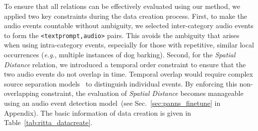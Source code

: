 To ensure that all relations can be effectively evaluated using our method, we applied two key constraints during the data creation process. First, to make the audio events countable without ambiguity, we selected inter-category audio events to form the \texttt{<textprompt,audio>} pairs. This avoids the ambiguity that arises when using intra-category events, especially for those with repetitive, similar local occurrences (\textit{e.g.}, multiple instances of dog barking). Second, for the \emph{Spatial Distance} relation, we introduced a temporal order constraint to ensure that the two audio events do not overlap in time. Temporal overlap would require complex source separation models~\citep{source_separation_icassp} to distinguish individual events. By enforcing this non-overlapping constraint, the evaluation of \emph{Spatial Distance} becomes manageable using an audio event detection model~(see Sec.~\ref{sec:panns_finetune} in Appendix). The basic information of data creation is given in Table~\ref{tab:ritta_datacreate}.

